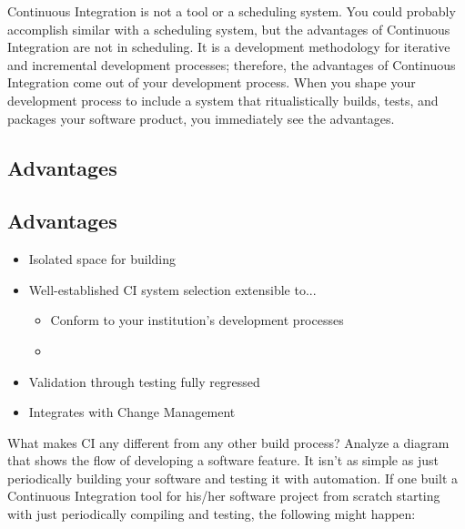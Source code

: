 \documentclass[12pt,notitlepage]{article}
\begin{document}
\begin{s5presentation}
\begin{s5slide}
\begin{s5notes}
    Continuous Integration is not a tool or a scheduling system. You could probably accomplish
    similar with a scheduling system, but the advantages of Continuous Integration are not in scheduling. 
    It is a development methodology for iterative and incremental development processes; therefore,
    the advantages of Continuous Integration come out of your development process. When you shape
    your development process to include a system that ritualistically builds, tests, and packages your 
    software product, you immediately see the advantages. 
    \W \end{s5notes}    
  \W \end {s5slide}

  \W \begin{s5slide}
    \section{Advantages}
    \W \end{s5slide}

  \W \begin{s5slide}
    \section{Advantages}
    \begin{itemize}
      \item Isolated space for building
      \item Well-established CI system selection extensible to...
        \begin{itemize}
          \item Conform to your institution's development processes
          \item 
        \end{itemize}
      \item Validation through testing fully regressed
      \item Integrates with Change Management
    \end{itemize}
    \W \begin{s5notes}
      What makes CI any different from any other build process? Analyze a diagram that 
      shows the flow of developing a software feature. It isn't as simple as just periodically 
    building your software and testing it with automation. If one built a Continuous Integration tool for
    his/her software project from scratch starting with just periodically compiling and testing, the following
    might happen:
    \W \end{s5notes}
    \W \end{s5slide}
  

\end{s5presentation}
\end{document}
